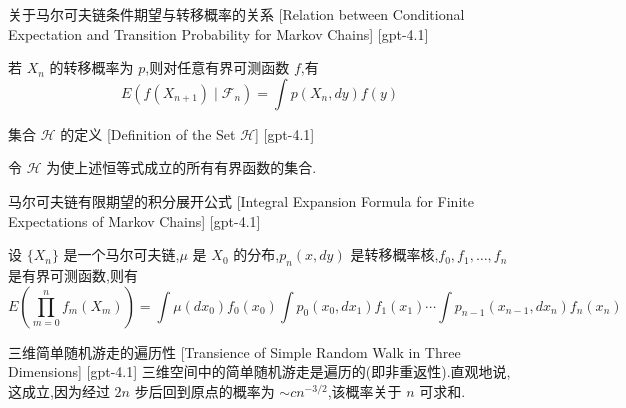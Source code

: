 \documentclass[UTF8]{ctexart}
\begin{document}
    
    
    \begin{thm}
        {关于马尔可夫链条件期望与转移概率的关系}
        [Relation between Conditional Expectation and Transition Probability for Markov Chains]
        [gpt-4.1]
        
若 $X_n$ 的转移概率为 $p$,则对任意有界可测函数 $f$,有
\[
E(f(X_{n+1}) \mid \mathcal{F}_n) = \int p(X_n, dy) f(y)
\]

    \end{thm}
    
    
    
    \begin{dfn}
        {集合 $\mathcal{H}$ 的定义}
        [Definition of the Set $\mathcal{H}$]
        [gpt-4.1]
        
令 $\mathcal{H}$ 为使上述恒等式成立的所有有界函数的集合.

    \end{dfn}
    
    
    
    \begin{thm}
        {马尔可夫链有限期望的积分展开公式}
        [Integral Expansion Formula for Finite Expectations of Markov Chains]
        [gpt-4.1]
        
设 $\{X_n\}$ 是一个马尔可夫链,$\mu$ 是 $X_0$ 的分布,$p_n(x, dy)$ 是转移概率核,$f_0, f_1, \ldots, f_n$ 是有界可测函数,则有
\[
E\left( \prod_{m=0}^{n} f_m(X_m) \right) = \int \mu(dx_0) f_0(x_0) \int p_0(x_0, dx_1) f_1(x_1) \cdots \int p_{n-1}(x_{n-1}, dx_n) f_n(x_n)
\]

    \end{thm}
    
    
    
    \begin{thm}
        {三维简单随机游走的遍历性}
        [Transience of Simple Random Walk in Three Dimensions]
        [gpt-4.1]
        三维空间中的简单随机游走是遍历的(即非重返性).直观地说,这成立,因为经过 $2n$ 步后回到原点的概率为 $\sim c n^{-3/2}$,该概率关于 $n$ 可求和.
    \end{thm}
    
    
    
\end{document}

